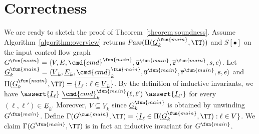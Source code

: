 
\section{Correctness}\label{sec:correctness}

We are ready to sketch the proof of Theorem~\ref{theorem:soundness}. 
Assume Algorithm~\ref{algorithm:overview} returns $\mathit{Pass} (\Pi (\underline{G}^{\fun{main}}_k, \TT))$ and $S[\bullet]$ on the input control flow graph $G^\fun{main} =
\langle V, E, \cmd{cmd}^\fun{main}, \overline{\mathtt{u}}^\fun{main}, \overline{\mathtt{r}}^\fun{main},s,e \rangle$. Let $\underline{G}^{\fun{main}}_k = \langle \underline{V}_k, \underline{E}_k,
\underline{\cmd{cmd}}_k^\fun{main} , \overline{\mathtt{u}}^\fun{main}, \overline{\mathtt{r}}^\fun{main},s,e \rangle$ and $\Pi (\underline{G}^{\fun{main}}_k, \TT) = \{ \underline{I}_{\ell}
: \ell \in \underline{V}_k \}$. By the definition of inductive invariants, we have
$\assert{\underline{I}_{\ell}}\ \underline{\cmd{cmd}}_k^\fun{main} (\ell, \ell')\ \assert{\underline{I}_{\ell'}}$
for every $(\ell, \ell') \in  \underline{E}_k$. Moreover, $V \subseteq  \underline{V}_k$ since
$\underline{G}^{\fun{main}}_k$ is obtained by unwinding $G^\fun{main}$. Define 
$\Gamma (G^\fun{main}, \TT) = \{ \underline{I}_{\ell} \in \Pi (\underline{G}^{\fun{main}}_k,
\TT) : \ell \in V \}$. We claim $\Gamma (G^\fun{main}, \TT)$
is in fact an inductive invariant for $G^\fun{main}$. 

